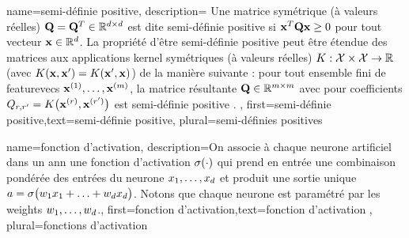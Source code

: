 
{name={semi-définie positive},
	description={
		Une matrice symétrique (à valeurs réelles) $\mathbf{Q} = \mathbf{Q}^{T} \in \mathbb{R}^{d \times d}$ 
		est dite semi-définie positive si ${\bf x}^{T} \mathbf{Q} {\bf x} \geq 0$ pour tout vecteur ${\bf x} \in \mathbb{R}^{d}$. 
		La propriété d’être semi-définie positive peut être étendue des matrices aux applications \gls{kernel} symétriques (à valeurs réelles) 
		$K: \mathcal{X} \times \mathcal{X} \rightarrow \mathbb{R}$ (avec $K({\bf x},{\bf x}') = K({\bf x}',{\bf x})$)
		de la manière suivante : pour tout ensemble fini de \glspl{featurevec} ${\bf x}^{(1)},\dots,{\bf x}^{(m)}$, 
		la matrice résultante $\mathbf{Q} \in \mathbb{R}^{m \times m}$ avec pour coefficients  
		$Q_{r,r'} = K\big({\bf x}^{(r)},{\bf x}^{(r')}\big)$ 
		est semi-définie positive \cite{LearningKernelsBook}.
	},
	first={semi-définie positive},text={semi-définie positive}, plural={semi-définies positives}
}

{name={fonction d'activation},
	description={On associe à chaque neurone artificiel dans un \gls{ann} 
		une fonction d'activation $\sigma(\cdot)$ qui prend en entrée une combinaison pondérée 
		des entrées du neurone $x_{1},\ldots,x_{d}$ et produit une 
		sortie unique $a = \sigma\big(w_{1} x_{1}+\ldots+w_{d} x_{d} \big)$. 
		Notons que chaque neurone est paramétré par les \gls{weights} $w_{1},\ldots,w_{d}$.},
	first={fonction d'activation},text={fonction d'activation} , plural={fonctions d'activation}
}


